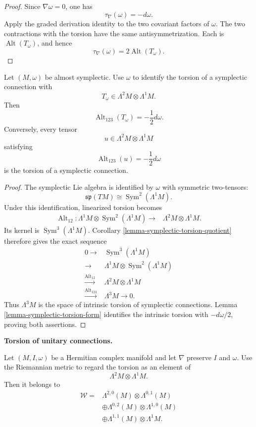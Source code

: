 \begin{proof}
Since $\nabla\omega=0$, one has
$$
\tau_\nabla(\omega)=-d\omega.
$$
Apply the graded derivation identity to the
two covariant factors of $\omega$. The two
contractions with the torsion have the same
antisymmetrization. Each is
$\operatorname{Alt}(T_\omega)$, and hence
$$
\tau_\nabla(\omega)
=2\operatorname{Alt}(T_\omega).
$$
\end{proof}

\begin{theorem}
\label{theorem-almost-symplectic-torsion}
Let $(M,\omega)$ be almost symplectic. Use
$\omega$ to identify the torsion of a
symplectic connection with
$$
T_\omega
\in\Lambda^2M\otimes\Lambda^1M.
$$
Then
$$
\operatorname{Alt}_{123}(T_\omega)
=-\frac{1}{2}d\omega.
$$
Conversely, every tensor
$$
u\in\Lambda^2M\otimes\Lambda^1M
$$
satisfying
$$
\operatorname{Alt}_{123}(u)
=-\frac{1}{2}d\omega
$$
is the torsion of a symplectic connection.
\end{theorem}

\begin{proof}
The symplectic Lie algebra is identified by
$\omega$ with symmetric two-tensors:
$$
\mathfrak{sp}(TM)
\cong\operatorname{Sym}^2(\Lambda^1M).
$$
Under this identification, linearized
torsion becomes
$$
\begin{aligned}
\operatorname{Alt}_{12}:
\Lambda^1M\otimes
\operatorname{Sym}^2(\Lambda^1M)
\longrightarrow{}&
\Lambda^2M\otimes\Lambda^1M.
\end{aligned}
$$
Its kernel is
$\operatorname{Sym}^3(\Lambda^1M)$.
Corollary
\ref{lemma-symplectic-torsion-quotient}
therefore gives the exact sequence
$$
\begin{aligned}
0\longrightarrow{}&
\operatorname{Sym}^3(\Lambda^1M)\\
\longrightarrow{}&
\Lambda^1M\otimes
\operatorname{Sym}^2(\Lambda^1M)\\
\xrightarrow{\operatorname{Alt}_{12}}{}&
\Lambda^2M\otimes\Lambda^1M\\
\xrightarrow{\operatorname{Alt}_{123}}{}&
\Lambda^3M\longrightarrow0.
\end{aligned}
$$
Thus $\Lambda^3M$ is the space of
intrinsic torsion of symplectic
connections. Lemma
\ref{lemma-symplectic-torsion-form}
identifies the intrinsic torsion with
$-d\omega/2$, proving both assertions.
\end{proof}

\medskip\noindent
{\bf Torsion of unitary connections.}

\begin{proposition}
\label{proposition-unitary-torsion-types}
Let $(M,I,\omega)$ be a Hermitian complex
manifold and let $\nabla$ preserve $I$ and
$\omega$. Use the Riemannian metric to
regard the torsion as an element of
$$
\Lambda^2M\otimes\Lambda^1M.
$$
Then it belongs to
$$
\begin{aligned}
\mathcal{W}={}&
\Lambda^{2,0}(M)\otimes\Lambda^{0,1}(M)\\
&\oplus\Lambda^{0,2}(M)
\otimes\Lambda^{1,0}(M)\\
&\oplus\Lambda^{1,1}(M)
\otimes\Lambda^1M.
\end{aligned}
$$
\end{proposition}

